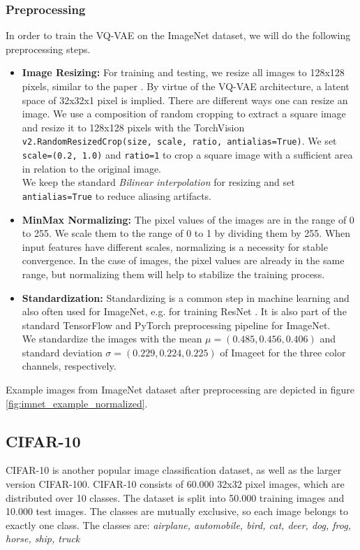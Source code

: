 \documentclass[10pt,a4paper,twoside]{article}
\begin{document}
    \subsubsection{Preprocessing}
    In order to train the VQ-VAE on the ImageNet dataset, we will do the following preprocessing steps.

    \begin{itemize}
        \item \textbf{Image Resizing:} For training and testing, we resize all images to 128x128 pixels, similar to the paper \cite{vqvae}. By virtue of the VQ-VAE architecture, a latent space of 32x32x1 pixel is implied.
        There are different ways one can resize an image. We use a composition of random cropping to extract a square image and resize it to 128x128 pixels with the TorchVision \texttt{v2.RandomResizedCrop(size, scale, ratio, antialias=True)}. We set \texttt{scale=(0.2, 1.0)} and \texttt{ratio=1} to crop a square image with a sufficient area in relation to the original image.\\
        We keep the standard \textit{Bilinear interpolation} for resizing and set \texttt{antialias=True} to reduce aliasing artifacts.

        \item \textbf{MinMax Normalizing:} The pixel values of the images are in the range of 0 to 255. We scale them to the range of 0 to 1 by dividing them by 255. When input features have different scales, normalizing is a necessity for stable convergence. In the case of images, the pixel values are already in the same range, but normalizing them will help to stabilize the training process.

        \item \textbf{Standardization:} Standardizing is a common step in machine learning and also often used for ImageNet, e.g. for training ResNet \cite{resnet}. It is also part of the standard TensorFlow and PyTorch preprocessing pipeline for ImageNet. \\
        We standardize the images with the mean $\mu = (0.485, 0.456, 0.406)$ and standard deviation $\sigma = (0.229, 0.224, 0.225)$ of Imageet for the three color channels, respectively.

    \end{itemize}

    Example images from ImageNet dataset after preprocessing are depicted in figure \ref{fig:imnet_example_normalized}.

    \subsection{CIFAR-10}
    CIFAR-10 \cite{cifar10} is another popular image classification dataset, as well as the larger version CIFAR-100. CIFAR-10 consists of 60.000 32x32 pixel images, which are distributed over 10 classes. The dataset is split into 50.000 training images and 10.000 test images. The classes are mutually exclusive, so each image belongs to exactly one class. The classes are: \textit{airplane, automobile, bird, cat, deer, dog, frog, horse, ship, truck}
\end{document}

